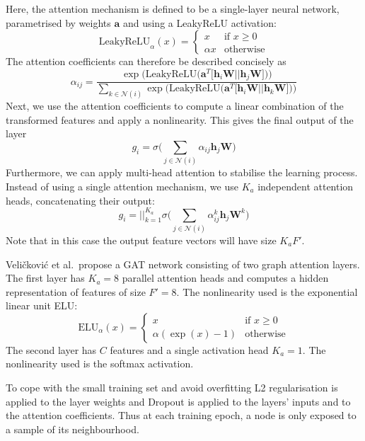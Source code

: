 \documentclass[12pt]{article}
\theoremstyle{definition}
\begin{document}
Here, the attention mechanism is defined to be a single-layer neural network, parametrised by weights $\textbf{a}$ and using a LeakyReLU activation: 
\[
\textrm{LeakyReLU}_{\alpha}(x) = 
	\begin{cases}
		x &\text{if $x \ge 0$}\\
		\alpha x &\text{otherwise}
	\end{cases}
\]
The attention coefficients can therefore be described concisely as
\[
\alpha_{ij} = \frac{\exp \big( \textrm{LeakyReLU}\big( \textbf{a}^T \big[ \mathbf{h}_i \textbf{W} \vert\vert \mathbf{h}_j \textbf{W} \big] \big) \big)}
{
\sum_{k \in \mathcal{N}(i)} \exp \big( \textrm{LeakyReLU}\big( \textbf{a}^T \big[ \mathbf{h}_i \textbf{W} \vert\vert \mathbf{h}_k \textbf{W} \big] \big) \big)
}
\]
Next, we use the attention coefficients to compute a linear combination of the transformed features and apply a nonlinearity. This gives the final output of the layer
\[
g_i = \sigma \big( \sum_{j \in \mathcal{N}(i)} \alpha_{ij} \mathbf{h}_j \textbf{W} \big)
\]
Furthermore, we can apply multi-head attention to stabilise the learning process. Instead of using a single attention mechanism, we use $K_a$ independent attention heads, concatenating their output:
\[
g_i = {\Big\vert\Big\vert}_{k=1}^{K_a} \sigma \big( \sum_{j \in \mathcal{N}(i)} \alpha_{ij}^k \mathbf{h}_j \textbf{W}^k \big)
\]
Note that in this case the output feature vectors will have size $K_a F'$.

\bigskip

Veli{\v{c}}kovi{\'{c}} et al.\ propose a GAT network consisting of two graph attention layers. The first layer has $K_a=8$ parallel attention heads and computes a hidden representation of features of size $F'=8$. The nonlinearity used is the exponential linear unit ELU:
\[
\textrm{ELU}_{\alpha}(x) = 
	\begin{cases}
		x &\text{if $x \ge 0$}\\
		\alpha (\exp(x) - 1) &\text{otherwise}
	\end{cases}
\]
The second layer has $C$ features and a single activation head $K_a=1$. The nonlinearity used is the softmax activation.

\bigskip

To cope with the small training set and avoid overfitting L2 regularisation is applied to the layer weights and Dropout \cite{srivastava2014dropout} is applied to the layers' inputs and to the attention coefficients. Thus at each training epoch, a node is only exposed to a sample of its neighbourhood. 
\end{document}

